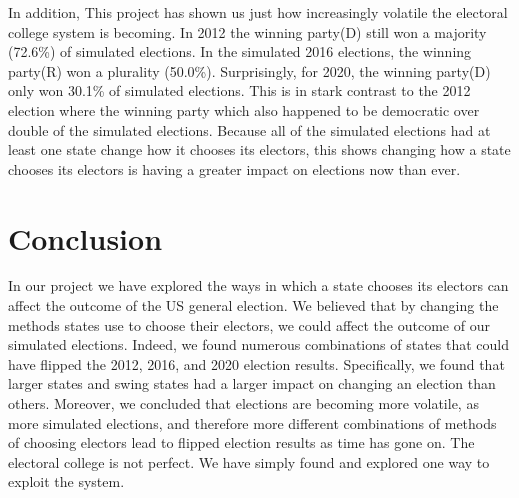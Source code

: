 \documentclass{article}
\begin{document}
In addition, This project has shown us just how increasingly volatile the electoral college system is becoming. In 2012 the winning party(D) still won a majority (72.6\%) of simulated elections. In the simulated 2016 elections, the winning party(R) won a plurality (50.0\%). Surprisingly, for 2020, the winning party(D) only won 30.1\% of simulated elections. This is in stark contrast to the 2012 election where the winning party which also happened to be democratic over double of the simulated elections. Because all of the simulated elections had at least one state change how it chooses its electors, this shows changing how a state chooses its electors is having a greater impact on elections now than ever.

\section{Conclusion}
In our project we have explored the ways in which a state chooses its electors can affect the outcome of the US general election. We believed that by changing the methods states use to choose their electors, we could affect the outcome of our simulated elections. Indeed, we found numerous combinations of states that could have flipped the 2012, 2016, and 2020 election results. Specifically, we found that larger states and swing states had a larger impact on changing an election than others. Moreover, we concluded that elections are becoming more volatile, as more simulated elections, and therefore more different combinations of  methods of choosing electors lead to flipped election results as time has gone on. The electoral college is not perfect. We have simply found and explored one way to exploit the system.



\end{document}
